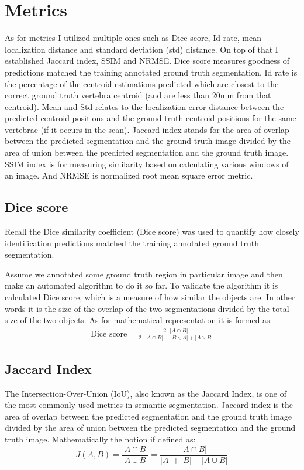 \newpage
\section{Metrics}
As for metrics I utilized multiple ones such as Dice score, Id rate, mean localization distance and standard deviation (std) distance. On top of that I established Jaccard index, SSIM and NRMSE. Dice score measures goodness of predictions matched the training annotated ground truth segmentation, Id rate is the percentage of the centroid estimations predicted which are closest to the correct ground truth vertebra centroid (and are less than 20mm from that centroid). Mean and Std relates to the localization error distance between the predicted centroid positions and the ground-truth centroid positions for the same vertebrae (if it occurs in the scan). Jaccard index stands for the area of overlap between the predicted segmentation and the ground truth image divided by the area of union between the predicted segmentation and the ground truth image. SSIM index is for measuring similarity based on calculating various windows of an image. And NRMSE is normalized root mean square error metric. 

\subsection{Dice score}
Recall the \cite{Thada2013} Dice similarity coefficient (Dice score) was used to quantify how closely identification predictions matched the training annotated ground truth segmentation. 

Assume we annotated some ground truth region in particular image and then make an automated algorithm to do it so far. To validate the algorithm it is calculated Dice score, which is a measure of how similar the objects are. In other words it is the size of the overlap of the two segmentations divided by the total size of the two objects. As for mathematical representation it is formed as:
\begin{align*}
  \text{Dice score} = \frac{2\cdot|A\cap B|}{2\cdot|A\cap B| + |B\backslash A| + |A\backslash B|}
\end{align*}

\subsection{Jaccard Index}
The Intersection-Over-Union (IoU), also known as the Jaccard Index, is one of the most commonly used metrics in semantic segmentation. Jaccard index is the area of overlap between the predicted segmentation and the ground truth image divided by the area of union between the predicted segmentation and the ground truth image. Mathematically the notion if defined as: 
\[ J(A,B) = \frac{|A \cap B|}{|A \cup B|} = \frac{|A \cap B|}{|A| + |B| - |A \cup B|}\]

